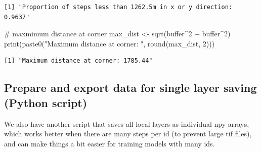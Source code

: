 \documentclass[
  letterpaper,
  DIV=11,
  numbers=noendperiod]{scrartcl}
\newenvironment{Shaded}{\begin{snugshade}}{\end{snugshade}}
\newcommand{\CommentTok}[1]{\textcolor[rgb]{0.37,0.37,0.37}{#1}}
\newcommand{\DecValTok}[1]{\textcolor[rgb]{0.68,0.00,0.00}{#1}}
\newcommand{\FunctionTok}[1]{\textcolor[rgb]{0.28,0.35,0.67}{#1}}
\newcommand{\NormalTok}[1]{\textcolor[rgb]{0.00,0.23,0.31}{#1}}
\newcommand{\OtherTok}[1]{\textcolor[rgb]{0.00,0.23,0.31}{#1}}
\newcommand{\SpecialCharTok}[1]{\textcolor[rgb]{0.37,0.37,0.37}{#1}}
\newcommand{\StringTok}[1]{\textcolor[rgb]{0.13,0.47,0.30}{#1}}
\begin{document}
\begin{verbatim}
[1] "Proportion of steps less than 1262.5m in x or y direction: 0.9637"
\end{verbatim}

\begin{Shaded}
\begin{Highlighting}[]
\CommentTok{\# maxmimum distance at corner}
\NormalTok{max\_dist }\OtherTok{\textless{}{-}} \FunctionTok{sqrt}\NormalTok{(buffer}\SpecialCharTok{\^{}}\DecValTok{2} \SpecialCharTok{+}\NormalTok{ buffer}\SpecialCharTok{\^{}}\DecValTok{2}\NormalTok{)}
\FunctionTok{print}\NormalTok{(}\FunctionTok{paste0}\NormalTok{(}\StringTok{"Maximum distance at corner: "}\NormalTok{, }\FunctionTok{round}\NormalTok{(max\_dist, }\DecValTok{2}\NormalTok{)))}
\end{Highlighting}
\end{Shaded}

\begin{verbatim}
[1] "Maximum distance at corner: 1785.44"
\end{verbatim}

\subsection{Prepare and export data for single layer saving (Python
script)}\label{prepare-and-export-data-for-single-layer-saving-python-script}

We also have another script that saves all local layers as individual
npy arrays, which works better when there are many steps per id (to
prevent large tif files), and can make things a bit easier for training
models with many ids.
\end{document}
